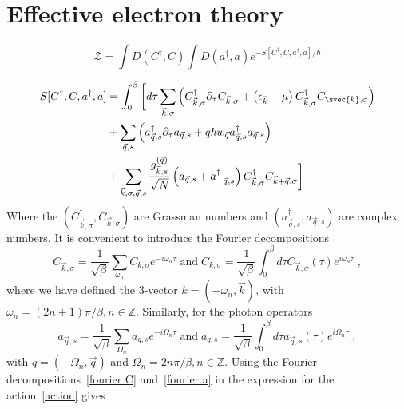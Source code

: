 \documentclass{article}
\begin{document}
\section{Effective electron theory}
\begin{equation}
    \mathcal{Z} = \int D(C^{\dagger}, C) \int D(a^{\dagger}, a) e^{-S[C^{\dagger},C,a^{\dagger},a] / \hbar}
    \label{path integral}
\end{equation}

\begin{align}
    S[C^{\dagger},C,a^{\dagger},a] &= \int_0^{\beta}\bigg[d\tau \sum_{\vec{k},\sigma}\left( C_{\vec{k},\sigma}^{\dagger} \partial_{\tau} C_{\vec{k},\sigma} + \left(\epsilon_{\vec{k}} - \mu\right) C_{\vec{k},\sigma}^{\dagger} C_{\svec{k},\sigma}\right) \nonumber\\ 
                                  &+ \sum_{\vec{q},s}\left( a_{\vec{q},s}^{\dagger} \partial_{\tau} a_{\vec{q},s} +q \hbar w_{\vec{q}} a_{\vec{q},s}^{\dagger}a_{\vec{q},s}\right) \label{action} \\
                                  &+ \sum_{\vec{k},\sigma,\vec{q},s} \frac{g_{\vec{k},s}^{(\vec{q})}}{\sqrt{N}} \left(a_{\vec{q},s} + a_{-\vec{q}, s}^{\dagger}\right) C_{\vec{k},\sigma}^{\dagger} C_{\vec{k} + \vec{q},\sigma}\bigg]\nonumber
\end{align}
Where the $(C_{\vec{k},\sigma}^{\dagger}, C_{\vec{k},\sigma})$ are Grassman numbers and $(a_{\vec{q},s}^{\dagger},a_{\vec{q},s})$ are complex numbers. It is convenient to introduce the Fourier decompositions
\begin{equation}
C_{\vec{k},\sigma} = \frac{1}{\sqrt{\beta}}\sum_{\omega_n} C_{k,\sigma} e^{-i \omega_n \tau}\;\text{and}\; C_{k,\sigma} = \frac{1}{\sqrt{\beta}} \int_0^{\beta} d\tau C_{\vec{k},\sigma}(\tau) e^{i \omega_n \tau}\;,
\label{fourier C}
\end{equation}
where we have defined the $3$-vector $k = (-\omega_n,\vec{k})$, with $\omega_n = (2n + 1)\pi / \beta, n \in  \mathbb{Z}$. Similarly, for the photon operators
\begin{equation}
a_{\vec{q},s} = \frac{1}{\sqrt{\beta}}\sum_{\Omega_n} a_{q,s} e^{-i \Omega_n \tau}\;\text{and}\; a_{q,s} = \frac{1}{\sqrt{\beta}} \int_0^{\beta} d\tau a_{\vec{q},s}(\tau) e^{i \Omega_n \tau}\;,
\label{fourier a}
\end{equation}
with $q = (-\Omega_n,\vec{q})$ and $\Omega_n = 2n\pi / \beta, n \in  \mathbb{Z}$. Using the Fourier decompositions~\cref{fourier C} and~\cref{fourier a} in the expression for the action~\cref{action} gives
\end{document}
